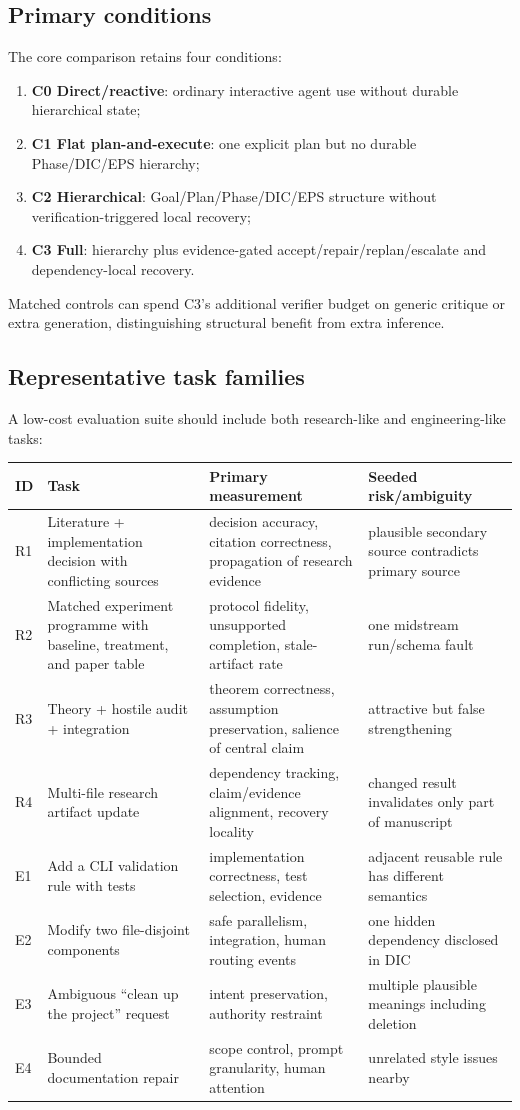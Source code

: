 \documentclass[11pt,a4paper]{article}
\begin{document}
\subsection{Primary conditions}
The core comparison retains four conditions:
\begin{enumerate}
\item \textbf{C0 Direct/reactive}: ordinary interactive agent use without durable hierarchical state;
\item \textbf{C1 Flat plan-and-execute}: one explicit plan but no durable Phase/DIC/EPS hierarchy;
\item \textbf{C2 Hierarchical}: Goal/Plan/Phase/DIC/EPS structure without verification-triggered local recovery;
\item \textbf{C3 Full}: hierarchy plus evidence-gated accept/repair/replan/escalate and dependency-local recovery.
\end{enumerate}
Matched controls can spend C3's additional verifier budget on generic critique or extra generation, distinguishing structural benefit from extra inference.

\subsection{Representative task families}
A low-cost evaluation suite should include both research-like and engineering-like tasks:
\begin{longtable}{P{0.06\textwidth}P{0.28\textwidth}P{0.26\textwidth}P{0.24\textwidth}}
\toprule
ID & Task & Primary measurement & Seeded risk/ambiguity\\\midrule
R1 & Literature + implementation decision with conflicting sources & decision accuracy, citation correctness, propagation of research evidence & plausible secondary source contradicts primary source\\
R2 & Matched experiment programme with baseline, treatment, and paper table & protocol fidelity, unsupported completion, stale-artifact rate & one midstream run/schema fault\\
R3 & Theory + hostile audit + integration & theorem correctness, assumption preservation, salience of central claim & attractive but false strengthening\\
R4 & Multi-file research artifact update & dependency tracking, claim/evidence alignment, recovery locality & changed result invalidates only part of manuscript\\
E1 & Add a CLI validation rule with tests & implementation correctness, test selection, evidence & adjacent reusable rule has different semantics\\
E2 & Modify two file-disjoint components & safe parallelism, integration, human routing events & one hidden dependency disclosed in DIC\\
E3 & Ambiguous ``clean up the project'' request & intent preservation, authority restraint & multiple plausible meanings including deletion\\
E4 & Bounded documentation repair & scope control, prompt granularity, human attention & unrelated style issues nearby\\
\bottomrule
\end{longtable}
\end{document}
